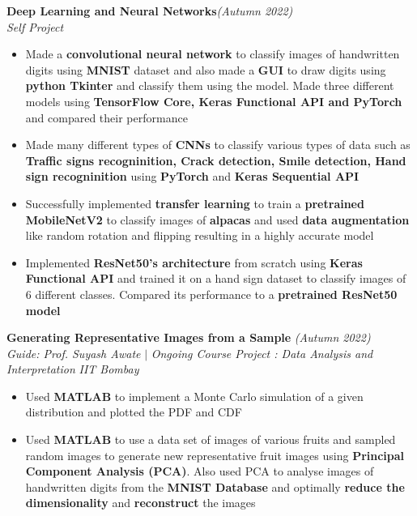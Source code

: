 \documentclass[a4paper,10pt]{article}
\begin{document}
\vspace{\baselineskip}
\vspace{-15pt}
\noindent\textbf{\large Deep Learning and Neural Networks}\hfill{\sl \small (Autumn 2022)}\\
{\it Self Project}
\\\vspace{-15pt}
\begin{itemize}[itemsep = -0.65 mm, leftmargin=*]
    \item Made a \textbf{convolutional neural network} to classify images of handwritten digits using \textbf{MNIST} dataset and also made a \textbf{GUI} to draw digits using \textbf{python Tkinter} and classify them using the model. Made three different models using \textbf{TensorFlow Core, Keras Functional API and PyTorch} and compared their performance
    \item Made many different types of \textbf{CNNs} to classify various types of data such as \textbf{Traffic signs recogninition, Crack detection, Smile detection, Hand sign recogninition} using \textbf{PyTorch} and \textbf{Keras Sequential API}
    \item Successfully implemented \textbf{transfer learning} to train a \textbf{pretrained MobileNetV2} to classify images of \textbf{alpacas} and used \textbf{data augmentation} like random rotation and flipping resulting in a highly accurate model
    \item Implemented \textbf{ResNet50's architecture} from scratch using \textbf{Keras Functional API} and trained it on a hand sign dataset to classify images of 6 different classes. Compared its performance to a \textbf{pretrained ResNet50 model}
\end{itemize}
\vspace{\baselineskip}
\vspace{-15pt}
\noindent\textbf{\large Generating Representative Images from a Sample} \hfill{\sl \small (Autumn 2022)}\\
{\it Guide: Prof. Suyash Awate} $|$ {\it Ongoing Course Project : Data Analysis and Interpretation } \hfill{\it IIT Bombay}
\vspace{-3pt}
\begin{itemize}[itemsep = -0.65 mm, leftmargin=*]
    \item Used \textbf{MATLAB} to implement a Monte Carlo simulation of a given distribution and plotted the PDF and CDF
    \item Used \textbf{MATLAB} to use a data set of images of various fruits and sampled random images to generate new
          representative fruit images using \textbf{Principal Component Analysis (PCA)}. Also used PCA to analyse images of handwritten digits from the \textbf{MNIST Database} and optimally \textbf{reduce the
              dimensionality} and \textbf{reconstruct} the images
\end{itemize}
\end{document}
